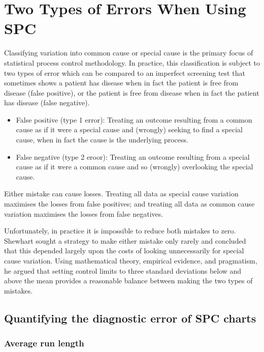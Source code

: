 \documentclass[
]{book}
\begin{document}
\chapter{Two Types of Errors When Using SPC}\label{diagnostics}

Classifying variation into common cause or special cause is the primary focus of statistical process control methodology. In practice, this classification is subject to two types of error which can be compared to an imperfect screening test that sometimes shows a patient has disease when in fact the patient is free from disease (false positive), or the patient is free from disease when in fact the patient has disease (false negative).

\begin{itemize}
\item
  False positive (type 1 error): Treating an outcome resulting from a common cause as if it were a special cause and (wrongly) seeking to find a special cause, when in fact the cause is the underlying process.
\item
  False negative (type 2 eroor): Treating an outcome resulting from a special cause as if it were a common cause and so (wrongly) overlooking the special cause.
\end{itemize}

Either mistake can cause losses. Treating all data as special cause variation maximises the losses from false positives; and treating all data as common cause variation maximises the losses from false negatives.

Unfortunately, in practice it is impossible to reduce both mistakes to zero. Shewhart sought a strategy to make either mistake only rarely and concluded that this depended largely upon the costs of looking unnecessarily for special cause variation. Using mathematical theory, empirical evidence, and pragmatism, he argued that setting control limits to three standard deviations below and above the mean provides a reasonable balance between making the two types of mistakes.

\section{Quantifying the diagnostic error of SPC charts}\label{quantifying-the-diagnostic-error-of-spc-charts}

\subsection{Average run length}\label{average-run-length}
\end{document}
